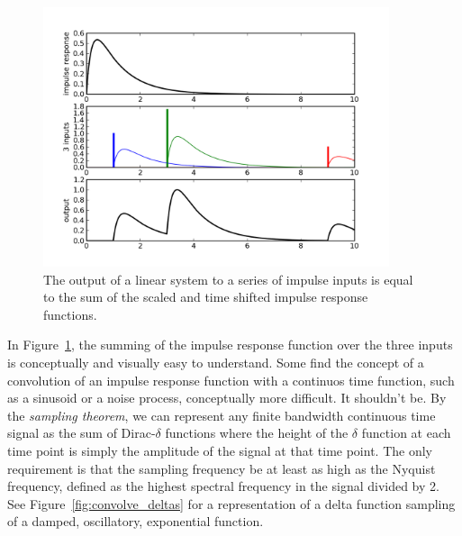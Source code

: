 \begin{center}%
\begin{figure}
\begin{centering}\includegraphics[width=4in]{fig/convolve_explain}\par\end{centering}
\caption{\label{fig:convolve_explain}The output of a linear system to
a series of impulse inputs is equal to the sum of the scaled and time
shifted impulse response functions.}
\end{figure}
\par\end{center}

In Figure~\ref{fig:convolve_explain}, the summing of the impulse
response function over the three inputs is conceptually and visually
easy to understand.  Some find the concept of a convolution of an
impulse response function with a continuos time function, such as a
sinusoid or a noise process, conceptually more difficult.  It
shouldn't be.  By the \textit{sampling theorem}, we can represent any
finite bandwidth continuous time signal as the sum of Dirac-$\delta$
functions where the height of the $\delta$ function at each time point
is simply the amplitude of the signal at that time point.  The only
requirement is that the sampling frequency be at least as high as the
Nyquist frequency, defined as the highest spectral frequency in the
signal divided by 2.  See Figure~\ref{fig:convolve_deltas} for a
representation of a delta function sampling of a damped, oscillatory,
exponential function.


